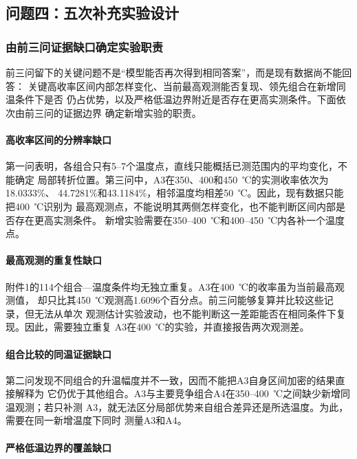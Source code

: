 \subsection{问题四：五次补充实验设计}

\subsubsection{由前三问证据缺口确定实验职责}

前三问留下的关键问题不是“模型能否再次得到相同答案”，而是现有数据尚不能回答：
关键高收率区间内部怎样变化、当前最高观测能否复现、领先组合在新增同温条件下是否
仍占优势，以及严格低温边界附近是否存在更高实测条件。下面依次由前三问的证据边界
确定新增实验的职责。

\paragraph{高收率区间的分辨率缺口}

第一问表明，各组合只有5--7个温度点，直线只能概括已测范围内的平均变化，不能确定
局部转折位置。第三问中，A3在350、400和450~℃的实测收率依次为18.0333\%、
44.7281\%和43.1184\%，相邻温度均相差50~℃。因此，现有数据只能把400~℃识别为
最高观测点，不能说明其两侧怎样变化，也不能判断区间内部是否存在更高实测条件。
新增实验需要在350--400~℃和400--450~℃内各补一个温度点。

\paragraph{最高观测的重复性缺口}

附件1的114个组合—温度条件均无独立重复。A3在400~℃的收率虽为当前最高观测值，
却只比其450~℃观测高1.6096个百分点。前三问能够复算并比较这些记录，但无法从单次
观测估计实验波动，也不能判断这一差距能否在相同条件下复现。因此，需要独立重复
A3在400~℃的实验，并直接报告两次观测差。

\paragraph{组合比较的同温证据缺口}

第二问发现不同组合的升温幅度并不一致，因而不能把A3自身区间加密的结果直接解释为
它仍优于其他组合。A3与主要竞争组合A4在350--400~℃之间缺少新增同温观测；若只补测
A3，就无法区分局部优势来自组合差异还是所选温度。为此，需要在同一新增温度下同时
测量A3和A4。

\paragraph{严格低温边界的覆盖缺口}

